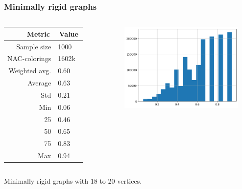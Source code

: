 \documentclass{beamer}
\begin{document}
\begin{frame}
	\frametitle{Minimally rigid graphs}
	\begin{columns}

		\begin{table}[ht]
			\centering
			\begin{tabular}{r|l}
				\toprule
				\,Metric\,    & \,Value\, \\
				\midrule
				Sample size   & 1000      \\
				NAC-colorings & 1602k     \\
				Weighted avg. & 0.60      \\
				Average       & 0.63      \\
				Std           & 0.21      \\
				Min           & 0.06      \\
				25            & 0.46      \\
				50            & 0.65      \\
				75            & 0.83      \\
				Max           & 0.94      \\
				\bottomrule
			\end{tabular}
		\end{table}


		\includegraphics[width=0.9\textwidth]{./assets/presentation_reviewer_minimally_rigid.png}
	\end{columns}

	\centering
	Minimally rigid graphs with 18 to 20 vertices.
\end{frame}
\end{document}
